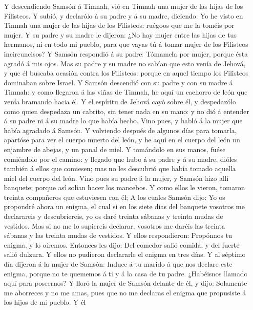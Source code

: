  Y descendiendo Samsón á Timnah, vió en Timnah una mujer de
las hijas de los Filisteos.  Y subió, y declarólo á su padre
y á su madre, diciendo: Yo he visto en Timnah una mujer de las hijas de
los Filisteos: ruégoos que me la toméis por mujer.  Y su
padre y su madre le dijeron: ¿No hay mujer entre las hijas de tus
hermanos, ni en todo mi pueblo, para que vayas tú á tomar mujer de los
Filisteos incircuncisos? Y Samsón respondió á su padre: Tómamela por
mujer, porque ésta agradó á mis ojos.  Mas su padre y su
madre no sabían que esto venía de Jehová, y que él buscaba ocasión
contra los Filisteos: porque en aquel tiempo los Filisteos dominaban
sobre Israel.  Y Samsón descendió con su padre y con su
madre á Timnah: y como llegaron á las viñas de Timnah, he aquí un
cachorro de león que venía bramando hacia él.  Y el espíritu
de Jehová cayó sobre él, y despedazólo como quien despedaza un cabrito,
sin tener nada en su mano: y no dió á entender á su padre ni á su madre
lo que había hecho.  Vino pues, y habló á la mujer que había
agradado á Samsón.  Y volviendo después de algunos días para
tomarla, apartóse para ver el cuerpo muerto del león, y he aquí en el
cuerpo del león un enjambre de abejas, y un panal de miel. 
Y tomándolo en sus manos, fuése comiéndolo por el camino: y llegado que
hubo á su padre y á su madre, dióles también á ellos que comiesen; mas
no les descubrió que había tomado aquella miel del cuerpo del león.
 Vino pues su padre á la mujer, y Samsón hizo allí
banquete; porque así solían hacer los mancebos.  Y como
ellos le vieron, tomaron treinta compañeros que estuviesen con él;
 A los cuales Samsón dijo: Yo os propondré ahora un enigma,
el cual si en los siete días del banquete vosotros me declarareis y
descubriereis, yo os daré treinta sábanas y treinta mudas de vestidos.
 Mas si no me lo supiereis declarar, vosotros me daréis las
treinta sábanas y las treinta mudas de vestidos. Y ellos respondieron:
Propónnos tu enigma, y lo oiremos.  Entonces les dijo: Del
comedor salió comida, y del fuerte salió dulzura. Y ellos no pudieron
declararle el enigma en tres días.  Y al séptimo día
dijeron á la mujer de Samsón: Induce á tu marido á que nos declare este
enigma, porque no te quememos á ti y á la casa de tu padre. ¿Habéisnos
llamado aquí para poseernos?  Y lloró la mujer de Samsón
delante de él, y dijo: Solamente me aborreces y no me amas, pues que no
me declaras el enigma que propusiste á los hijos de mi pueblo. Y él

